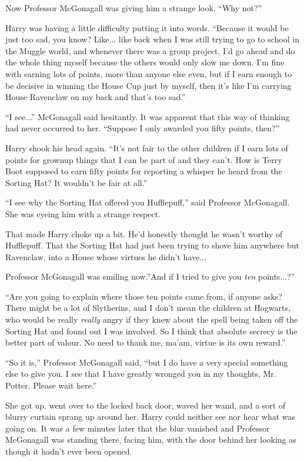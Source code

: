 Now Professor McGonagall was giving him a strange look. ``Why not?''

Harry was having a little difficulty putting it into words. ``Because it
would be just too sad, you know? Like... like back when I was still
trying to go to school in the Muggle world, and whenever there was a
group project, I'd go ahead and do the whole thing myself because the
others would only slow me down. I'm fine with earning lots of points,
more than anyone else even, but if I earn enough to be decisive in
winning the House Cup just by myself, then it's like I'm carrying House
Ravenclaw on my back and that's too sad.''

``I see...'' McGonagall said hesitantly. It was apparent that this
way of thinking had never occurred to her. ``Suppose I only awarded you
fifty points, then?''

Harry shook his head again. ``It's not fair to the other children if I
earn lots of points for grownup things that I can be part of and they
can't. How is Terry Boot supposed to earn fifty points for reporting a
whisper he heard from the Sorting Hat? It wouldn't be fair at all.''

``I see why the Sorting Hat offered you Hufflepuff,'' said Professor
McGonagall. She was eyeing him with a strange respect.

That made Harry choke up a bit. He'd honestly thought he wasn't worthy
of Hufflepuff. That the Sorting Hat had just been trying to shove him
anywhere but Ravenclaw, into a House whose virtues he didn't
have...

Professor McGonagall was smiling now.''And if I tried to give you
\emph{ten} points...?''

``Are you going to explain where those ten points came from, if anyone
asks? There might be a lot of Slytherins, and I don't mean the children
at Hogwarts, who would be really \emph{really} angry if they knew about
the spell being taken off the Sorting Hat and found out I was involved.
So I think that absolute secrecy is the better part of valour. No need
to thank me, ma'am, virtue is its own reward.''

``So it is,'' Professor McGonagall said, ``but I do have a very special
something else to give you. I see that I have greatly wronged you in my
thoughts, Mr. Potter. Please wait here.''

She got up, went over to the locked back door, waved her wand, and a
sort of blurry curtain sprang up around her. Harry could neither see nor
hear what was going on. It was a few minutes later that the blur
vanished and Professor McGonagall was standing there, facing him, with
the door behind her looking as though it hadn't ever been opened.

